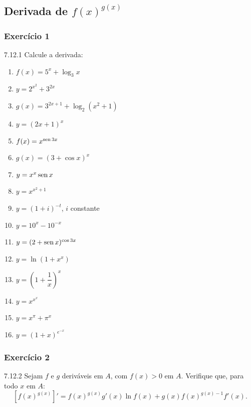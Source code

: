 \subsection{Derivada de $f(x)^{g(x)}$}

\subsubsection*{Exercício 1}
\begin{exercicio}[1]{7.12.1}
Calcule a derivada:
\begin{enumerate}[label=\alph*)]
    \item $f(x) = 5^x + \log_3 x$
    \item $y = 2^{x^2} + 3^{2x}$
    \item $g(x) = 3^{2x + 1} + \log_2 (x^2 + 1)$
    \item $y = (2x + 1)^x$
    \item $f(x) = x^{\operatorname{sen} 3x}$
    \item $g(x) = (3 + \cos x)^x$
    \item $y = x^x \operatorname{sen} x$
    \item $y = x^{x^2 + 1}$
    \item $y = (1 + i)^{-t}$, $i$ constante
    \item $y = 10^x - 10^{-x}$
    \item $y = (2 + \operatorname{sen} x)^{\cos 3x}$
    \item $y = \ln(1 + x^x)$
    \item $y = \left(1 + \dfrac{1}{x}\right)^{\!x}$
    \item $y = x^{x^x}$
    \item $y = x^\pi + \pi^x$
    \item $y = (1 + x)^{e^{-x}}$
\end{enumerate}
\end{exercicio}

\subsubsection*{Exercício 2}
\begin{exercicio}[2]{7.12.2}
Sejam $f$ e $g$ deriváveis em $A$, com $f(x) > 0$ em $A$. Verifique que, para todo $x$ em $A$:
\[
[f(x)^{g(x)}]' = f(x)^{g(x)} g'(x) \ln f(x) + g(x) f(x)^{g(x) - 1} f'(x).
\]
\end{exercicio}

